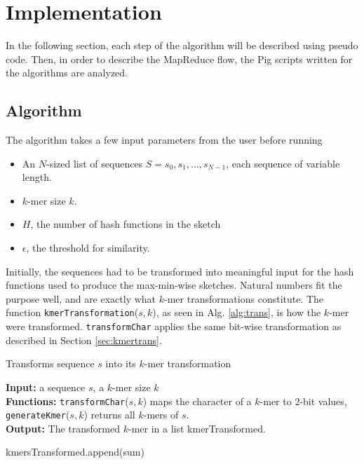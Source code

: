 \documentclass[../../main.tex]{subfiles}
\begin{document}
\section{Implementation}

In the following section, each step of the algorithm  will be described using pseudo code. Then, in order to describe the MapReduce flow, the Pig scripts written for the algorithms are analyzed.


\subsection{Algorithm}
The algorithm takes a few input parameters from the user before running
\begin{itemize}
\item An $N$-sized list of sequences $S={s_0,s_1,\ldots,s_{N-1}}$, each sequence of variable length.
\item $k$-mer size $k$.
\item $H$, the number of hash functions in the sketch
\item $\epsilon$, the threshold for similarity.  
\end{itemize}

Initially, the sequences had to be  transformed into meaningful input for the hash functions used to produce the max-min-wise sketches. Natural numbers fit the purpose well, and are exactly what $k$-mer transformations constitute. The function \texttt{kmerTransformation}($s,k$), as seen in Alg. \ref{alg:trans}, is how the $k$-mer were transformed. \texttt{transformChar} applies the same bit-wise transformation as described in Section \ref{sec:kmertrans}. 

\begin{algorithm}
\caption{Transforms sequence $s$ into its $k$-mer transformation}\label{alg:trans}
\textbf{Input:} a sequence $s$, a $k$-mer size $k$\\
\textbf{Functions:} \texttt{transformChar}($s,k$) maps the character of a $k$-mer to 2-bit values, \texttt{generateKmer}($s,k$) returns all $k$-mers of $s$.\\
\textbf{Output:} The transformed $k$-mer in a list kmerTransformed.
\begin{algorithmic}[1]
\Statex
{}
	
	 
		\EndFor
		\State kmersTransformed.append(sum)
	\EndFor
\State {}
\EndFunction
\end{algorithmic}
\end{algorithm}
\end{document}
